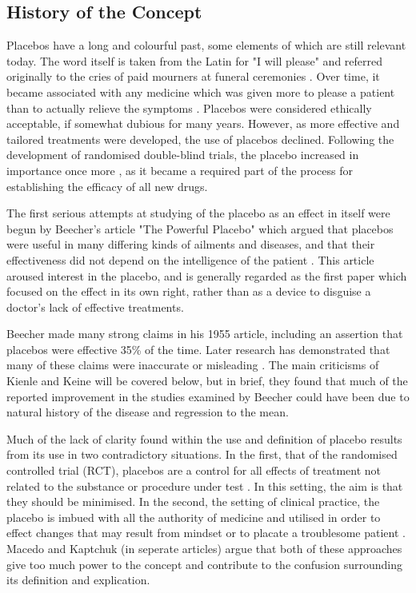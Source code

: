 \subsection{History of the Concept} 
\label{sec:history-concept}

Placebos have a long and colourful past, some elements of which are still relevant today. The word itself is taken from the Latin for "I will please" and referred originally to the cries of paid mourners at funeral ceremonies \cite{Macedo2003}. Over time, it became associated with any medicine which was given more to please a patient than to actually relieve the symptoms \cite{Kaptchuk1998}. Placebos were considered ethically acceptable, if somewhat dubious for many years. However, as more effective and tailored treatments were developed, the use of placebos declined. Following the development of randomised double-blind trials, the  placebo increased in importance once more \cite{Kaptchuk1998}, as it became a required part of the process for establishing the efficacy of all new drugs.  

The first serious attempts at studying of the placebo as an effect in itself  were begun by Beecher's article "The Powerful Placebo" which argued that placebos were useful in many differing kinds of ailments and diseases, and that their effectiveness did not depend on the intelligence of the patient \cite{beecher1955powerful,Kaptchuk1998}.  This article aroused interest in the placebo, and is generally regarded as the first paper which focused on the effect in its own right, rather than as a device to disguise a doctor's lack of effective treatments. 

Beecher made many strong claims in his 1955 article, including an assertion that placebos were effective 35\% of the time. Later research has demonstrated that many of these claims were  inaccurate or misleading \cite{Kienle1998}. The main criticisms of Kienle and Keine will be covered below, but in brief, they found that much of the reported improvement in the studies examined by Beecher could have been due to natural history of the disease and regression to the mean.  

Much of the lack of clarity found within the use and definition of placebo \cite{Macedo2003,Kaptchuk1998} results from its use in two contradictory situations. In the first, that of the randomised controlled trial (RCT), placebos are a control for all effects of treatment not related to the substance or procedure under test \cite{Vickers2000}. In this setting, the aim is that they should be minimised. In the second, the setting of clinical practice, the placebo is imbued with all the authority of medicine and utilised in order to effect changes that may result from mindset or to placate a troublesome patient \cite{Bootzin2003,Sherman2008a}. Macedo and Kaptchuk (in seperate articles) argue that both of these approaches give too much power to the concept and contribute to the confusion surrounding its definition and explication. 

